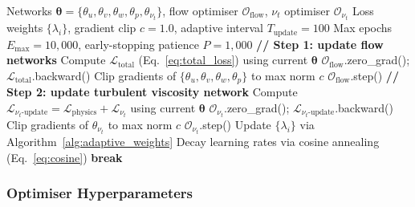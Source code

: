 \documentclass[11pt,a4paper]{article}
\begin{document}
\begin{algorithm}[t]
\caption{Per-Epoch Training Loop with Alternating Dual-Optimiser}
\label{alg:training}
\begin{algorithmic}[1]
\Require Networks $\boldsymbol{\theta} = \{\theta_u, \theta_v, \theta_w, \theta_p, \theta_{\nu_t}\}$, flow optimiser $\mathcal{O}_{\text{flow}}$, $\nu_t$ optimiser $\mathcal{O}_{\nu_t}$
\Require Loss weights $\{\lambda_i\}$, gradient clip $c = 1.0$, adaptive interval $T_{\text{update}} = 100$
\Require Max epochs $E_{\max} = 10{,}000$, early-stopping patience $P = 1{,}000$
        \State \textbf{// Step 1: update flow networks}
        \State Compute $\mathcal{L}_{\text{total}}$ \hspace{0.5em}(Eq.~\ref{eq:total_loss}) using current $\boldsymbol{\theta}$
        \State $\mathcal{O}_{\text{flow}}$.zero\_grad(); \; $\mathcal{L}_{\text{total}}$.backward()
        \State Clip gradients of $\{\theta_u,\theta_v,\theta_w,\theta_p\}$ to max norm $c$
        \State $\mathcal{O}_{\text{flow}}$.step()
        \State \textbf{// Step 2: update turbulent viscosity network}
        \State Compute $\mathcal{L}_{\nu_t\text{-update}} = \mathcal{L}_{\text{physics}} + \mathcal{L}_{\nu_t}$ using current $\boldsymbol{\theta}$
        \State $\mathcal{O}_{\nu_t}$.zero\_grad(); \; $\mathcal{L}_{\nu_t\text{-update}}$.backward()
        \State Clip gradients of $\theta_{\nu_t}$ to max norm $c$
        \State $\mathcal{O}_{\nu_t}$.step()
    \EndFor
        \State Update $\{\lambda_i\}$ via Algorithm~\ref{alg:adaptive_weights} 
    \EndIf
    \State Decay learning rates via cosine annealing (Eq.~\ref{eq:cosine})
        \State \textbf{break} 
    \EndIf
\EndFor
\end{algorithmic}
\end{algorithm}

\subsubsection{Optimiser Hyperparameters}
\end{document}
